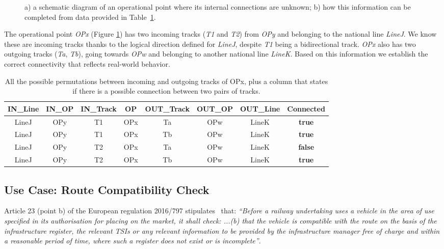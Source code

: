 \begin{figure}[t]
	
	\caption{a) %
	a schematic diagram of an operational point where its internal connections are unknown;
    b) %
    how this information can be completed from %
    data provided in Table~\ref{table:1}.} 
	\label{fig:1}
\end{figure} 

The operational point \textit{OPx} (Figure \ref{fig:1})
has two incoming tracks (\textit{T1} and \textit{T2})
from \textit{OPy} and belonging to the national line \textit{LineJ}.
We know these are incoming tracks
thanks to the logical direction defined for \textit{LineJ},
despite \textit{T1} being a bidirectional track.
\textit{OPx} also has two outgoing tracks
(\textit{Ta}, \textit{Tb}),
going towards \textit{OPw} and belonging to another national line \textit{LineK}.
Based on this information we establish
the correct connectivity that reflects real-world behavior.

\begin{table}[h!]
\centering
\begin{tabular}{| c | c | c | c | c | c | c | c |}
 \hline
 IN\_Line & IN\_OP & IN\_Track & OP & OUT\_Track & OUT\_OP & OUT\_Line & Connected \\
 \hline
 LineJ & OPy & T1 & OPx & Ta & OPw & LineK & \textbf{true} \\ 
 LineJ & OPy & T1 & OPx & Tb & OPw & LineK & \textbf{true} \\  
 LineJ & OPy & T2 & OPx & Ta & OPw & LineK & \textbf{false} \\   
 LineJ & OPy & T2 & OPx & Tb & OPw & LineK & \textbf{true} \\
 \hline
\end{tabular}
\caption{All the possible permutations between incoming and outgoing tracks of OPx,
plus a column that states if there is a possible connection between two pairs of tracks.}
\label{table:1}
\end{table}

\subsection{Use Case: Route Compatibility Check}
Article 23 (point b) of the European regulation 2016/797 stipulates~\cite{eu-797-2016} that:
\textit{``Before a railway undertaking uses a vehicle in the area of use specified in its authorisation for placing on the market, it shall check: ...(b) that the vehicle is compatible with the route on the basis of the infrastructure register, the relevant TSIs or any relevant information to be provided by the infrastructure manager free of charge and within a reasonable period of time, where such a register does not exist or is incomplete''}.


